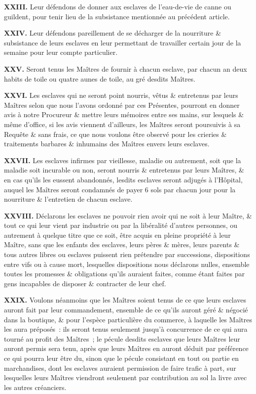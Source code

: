 \documentclass[twoside]{book} %
\newcommand{\labelchar}[1]{\textbf{\color{rubric} #1}}
\begin{document}
\labelchar{XXIII.} Leur défendons de donner aux esclaves de l’eau-de-vie de canne ou guildent, pour tenir lieu de la subsistance mentionnée au précédent article.\par
\labelchar{XXIV.} Leur défendons pareillement de se décharger de la nourriture \& subsistance de leurs esclaves en leur permettant de travailler certain jour de la semaine pour leur compte particulier.\par
\labelchar{XXV.} Seront tenus les Maîtres de fournir à chacun esclave, par chacun an deux habits de toile ou quatre aunes de toile, au gré desdits Maîtres.\par
\labelchar{XXVI.} Les esclaves qui ne seront point nourris, vêtus \& entretenus par leurs Maîtres selon que nous l’avons ordonné par ces Présentes, pourront en donner avis à notre Procureur \& mettre leurs mémoires entre ses mains, sur lesquels \& même d’office, si les avis viennent d’ailleurs, les Maîtres seront poursuivis à sa Requête \& sans frais, ce que nous voulons être observé pour les crieries \& traitements barbares \& inhumains des Maîtres envers leurs esclaves.\par
\labelchar{XXVII.} Les esclaves infirmes par vieillesse, maladie ou autrement, soit que la maladie soit incurable ou non, seront nourris \& entretenus par leurs Maîtres, \& en cas qu’ils les eussent abandonnés, lesdits esclaves seront adjugés à l’Hôpital, auquel les Maîtres seront condamnés de payer 6 sols par chacun jour pour la nourriture \& l’entretien de chacun esclave.\par
\labelchar{XXVIII.} Déclarons les esclaves ne pouvoir rien avoir qui ne soit à leur Maître, \& tout ce qui leur vient par industrie ou par la libéralité d’autres personnes, ou autrement à quelque titre que ce soit, être acquis en pleine propriété à leur Maître, sans que les enfants des esclaves, leurs pères \& mères, leurs parents \& tous autres libres ou esclaves puissent rien prétendre par successions, dispositions entre vifs ou à cause mort, lesquelles dispositions nous déclarons nulles, ensemble toutes les promesses \& obligations qu’ils auraient faites, comme étant faites par gens incapables de disposer \& contracter de leur chef.\par
\labelchar{XXIX.} Voulons néanmoins que les Maîtres soient tenus de ce que leurs esclaves auront fait par leur commandement, ensemble de ce qu’ils auront géré \& négocié dans la boutique, \& pour l’espèce particulière du commerce, à laquelle les Maîtres les aura préposés : ils seront tenus seulement jusqu’à concurrence de ce qui aura tourné au profit des Maîtres ; le pécule desdits esclaves que leurs Maîtres leur auront permis sera tenu, après que leurs Maîtres en auront déduit par préférence ce qui pourra leur être du, sinon que le pécule consistant en tout ou partie en marchandises, dont les esclaves auraient permission de faire trafic à part, sur lesquelles leurs Maîtres viendront seulement par contribution au sol la livre avec les autres créanciers.\par
\end{document}

